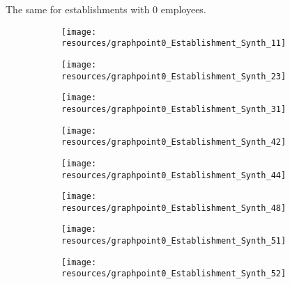 \documentclass[12pt]{article}
\begin{document}
\pagebreak
The same for establishments with 0 employees. 
\begin{center}
	\centering
	
\end{center}

\begin{center}
	\centering
	
\end{center}

\begin{center}
	\centering
	
\end{center}


\begin{figure}[H]
	\centering
	\begin{subfigure}[b]{0.4\textwidth}
	    \texttt{[image: resources/graphpoint0\_Establishment\_Synth\_11]}
	\end{subfigure}
	\begin{subfigure}[b]{0.4\textwidth}
		  \texttt{[image: resources/graphpoint0\_Establishment\_Synth\_23]}
	\end{subfigure}
\end{figure}

\begin{figure}[H]
	\centering
	\begin{subfigure}[b]{0.4\textwidth}
	    \texttt{[image: resources/graphpoint0\_Establishment\_Synth\_31]}
	\end{subfigure}
	\begin{subfigure}[b]{0.4\textwidth}
		  \texttt{[image: resources/graphpoint0\_Establishment\_Synth\_42]}
	\end{subfigure}
\end{figure}

\begin{figure}[H]
	\centering
	\begin{subfigure}[b]{0.4\textwidth}
	    \texttt{[image: resources/graphpoint0\_Establishment\_Synth\_44]}
	\end{subfigure}
	\begin{subfigure}[b]{0.4\textwidth}
		  \texttt{[image: resources/graphpoint0\_Establishment\_Synth\_48]}
	\end{subfigure}
\end{figure}

\begin{figure}[H]
	\centering
	\begin{subfigure}[b]{0.4\textwidth}
	    \texttt{[image: resources/graphpoint0\_Establishment\_Synth\_51]}
	\end{subfigure}
	\begin{subfigure}[b]{0.4\textwidth}
		  \texttt{[image: resources/graphpoint0\_Establishment\_Synth\_52]}
	\end{subfigure}
\end{figure}
\end{document}

